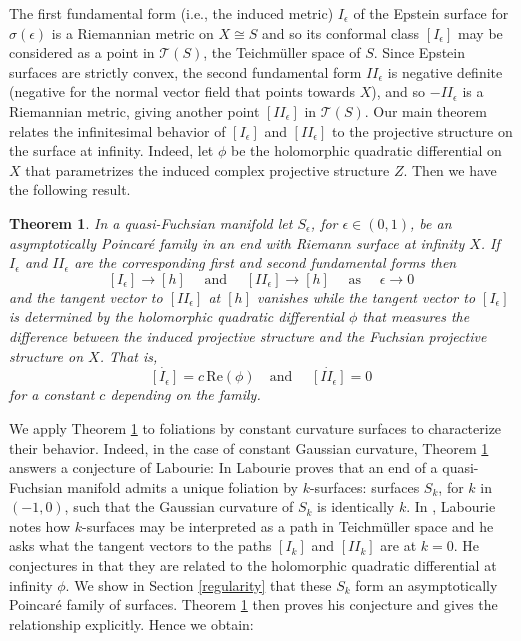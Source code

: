 \documentclass{amsart}
\newtheorem{bigthm}{Theorem}
\newcommand{\two}{I\!\!I}
\begin{document}
The first fundamental form (i.e., the induced metric) $I_\epsilon$ of the Epstein surface for $\sigma(\epsilon)$ is a Riemannian metric on $X \cong S$ and so its conformal class $[I_\epsilon]$ may be considered as a point in $\mathcal{T}(S)$, the Teichm\"uller space of $S$. 
Since Epstein surfaces are strictly convex, the second fundamental form $\two_\epsilon$ is negative definite (negative for the normal vector field that points towards $X$), and so $-\two_\epsilon$ is a Riemannian metric, giving another point $[\two_\epsilon]$ in $\mathcal{T}(S)$.
Our main theorem relates the infinitesimal behavior of $[I_\epsilon]$ and $[\two_\epsilon]$ to the projective structure on the surface at infinity.
Indeed, let $\phi$ be the holomorphic quadratic differential on $X$ that parametrizes the induced complex projective structure $Z$.
Then we have the following result. 

\begin{bigthm}
\label{main-thm-intro}
In a quasi-Fuchsian manifold let $S_\epsilon$, for $\epsilon \in (0,1)$, be an asymptotically Poincar\'e family in an end with Riemann surface at infinity $X$.
If $I_\epsilon$ and $\two_\epsilon$ are the corresponding first and second fundamental forms then 
\[
[I_\epsilon] \to [h] 
\quad \text{ and } \quad 
[\two_\epsilon] \to [h]
\quad \text{ as } \quad \epsilon \to 0
\] 
and the tangent vector to $[\two_\epsilon]$ at $[h]$ vanishes while the tangent vector to $[I_\epsilon]$ is determined by the holomorphic quadratic differential $\phi$ that measures the difference between the induced projective structure and the Fuchsian projective structure on $X$.
That is,
\[
\dot{[I_\epsilon]} = c \, \mathrm{Re}(\phi) \quad \text{and } \quad \dot{[\two_\epsilon]} = 0
\]
for a constant $c$ depending on the family.
\end{bigthm} 
We apply Theorem \ref{main-thm-intro} to foliations by constant curvature surfaces to characterize their behavior. 
Indeed, in the case of constant Gaussian curvature, Theorem \ref{main-thm-intro} answers a conjecture of Labourie:
In \cite{labourie1991} Labourie proves that an end of a quasi-Fuchsian manifold admits a unique foliation by $k$-surfaces: surfaces $S_k$, for $k$ in $(-1,0)$, such that the Gaussian curvature of $S_k$ is identically $k$. 
In \cite{labourie1992}, Labourie notes how $k$-surfaces may be interpreted as a path in Teichm\"uller space and he asks what the tangent vectors to the paths $[I_k]$ and $[\two_k]$ are at $k=0$. 
He conjectures in that they are related to the holomorphic quadratic differential at infinity $\phi$.
We show in Section \ref{regularity} that these $S_k$ form an asymptotically Poincar\'e family of surfaces.
Theorem \ref{main-thm-intro} then proves his conjecture and gives the relationship explicitly.
Hence we obtain:
\end{document}
